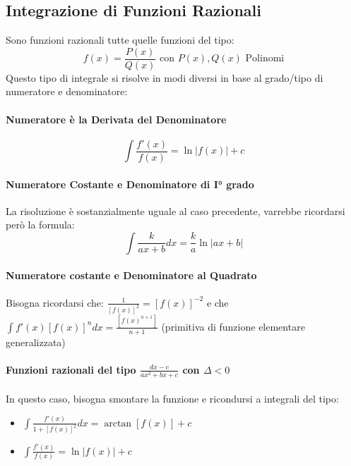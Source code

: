 \documentclass[12pt, a4paper, openany]{book}
\begin{document}
	\subsection{Integrazione di Funzioni Razionali}
	Sono funzioni razionali tutte quelle funzioni del tipo:
	$$f(x)=\frac{P(x)}{Q(x)} \text{ con } P(x),Q(x) \text{ Polinomi} $$
	Questo tipo di integrale si risolve in modi diversi in base al grado/tipo di numeratore e denominatore:
	\paragraph*{Numeratore è la Derivata del Denominatore}
	$$\int \frac{f'(x)}{f(x)} = \ln|f(x)|+ c$$

	\paragraph*{Numeratore Costante e Denominatore di I° grado}
	La risoluzione è sostanzialmente uguale al caso precedente, varrebbe ricordarsi però la formula:
	$$\int\frac{k}{ax+b} dx = \frac{k}{a} \ln|ax+b|$$
	
	\paragraph*{Numeratore costante e Denominatore al Quadrato}
	Bisogna ricordarsi che:
	$\frac{1}{[f(x)]^2} = [f(x)]^{-2}$ e che 
	$\int f'(x)[f(x)]^n dx = \frac{[f(x)^{n+1}]}{n+1}$ (primitiva di funzione elementare generalizzata)
	
	\paragraph*{Funzioni razionali del tipo $\frac{dx-c}{ax^2+bx+c}$ con $\Delta < 0$}
	In questo caso, bisogna smontare la funzione e ricondursi a integrali del tipo:
	\begin{itemize}
		\item $\int\frac{f'(x)}{1+[f(x)]^2} dx = \arctan[f(x)]+c$
  		\item $\int\frac{f'(x)}{f(x)} = \ln|f(x)| +c $ 
	\end{itemize}
\end{document}
